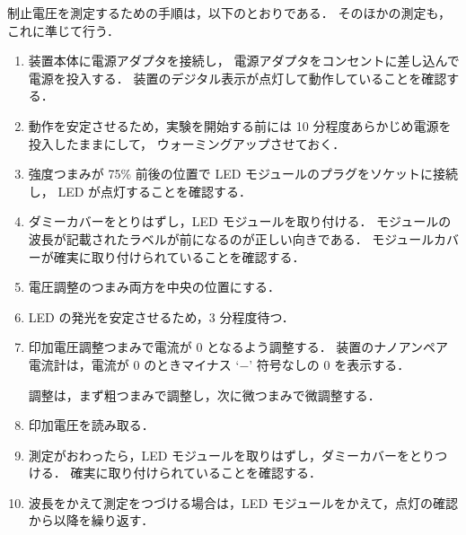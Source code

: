 \documentclass[11pt,sort]{jarticle}
\begin{document}
制止電圧を測定するための手順は，以下のとおりである．
そのほかの測定も，これに準じて行う．
\begin{enumerate}
\item
装置本体に電源アダプタを接続し，
電源アダプタをコンセントに差し込んで電源を投入する．
装置のデジタル表示が点灯して動作していることを確認する．
\item
動作を安定させるため，実験を開始する前には 10 分程度あらかじめ電源を投入したままにして，
ウォーミングアップさせておく．
\item
強度つまみが 75\% 前後の位置で LED モジュールのプラグをソケットに接続し， LED が点灯することを確認する．
\item
ダミーカバーをとりはずし，LED モジュールを取り付ける．
モジュールの波長が記載されたラベルが前になるのが正しい向きである．
モジュールカバーが確実に取り付けられていることを確認する．
\item
電圧調整のつまみ両方を中央の位置にする．
\item
LED の発光を安定させるため，3 分程度待つ．
\item
印加電圧調整つまみで電流が $0$ となるよう調整する．
装置のナノアンペア電流計は，電流が $0$ のときマイナス `$-$' 符号なしの $0$ を表示する．

調整は，まず粗つまみで調整し，次に微つまみで微調整する．
\item
印加電圧を読み取る．
\item
測定がおわったら，LED モジュールを取りはずし，ダミーカバーをとりつける．
確実に取り付けられていることを確認する．
\item
波長をかえて測定をつづける場合は，LED モジュールをかえて，点灯の確認から以降を繰り返す．
\end{enumerate}


\end{document}
